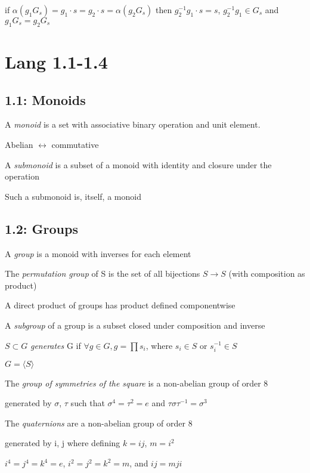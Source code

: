 \documentclass[12pt]{article}
\begin{document}
if $\alpha(g_1G_s) = g_1 \cdot s = g_2 \cdot s = \alpha(g_2G_s)$
then $g_2^{-1}g_1 \cdot s = s$, $g_2^{-1}g_1 \in G_s$ and $g_1G_s = g_2G_s$

\section{Lang 1.1-1.4}

\subsection{1.1: Monoids}

\noindent
A \textit{monoid} is a set with associative binary operation and unit element.

Abelian $\leftrightarrow$ commutative

\noindent
A \textit{submonoid} is a subset of a monoid with identity and closure under the operation

Such a submonoid is, itself, a monoid

\subsection{1.2: Groups}

\noindent
A \textit{group} is a monoid with inverses for each element

\noindent
The \textit{permutation group} of S is the set of all bijections $S \to S$ (with composition as product)

\noindent
A direct product of groups has product defined componentwise

\noindent
A \textit{subgroup} of a group is a subset closed under composition and inverse

\noindent
$S \subset G$ \textit{generates} G if $\forall g \in G, g = \prod s_i$, where $s_i \in S$ or $s_i^{-1} \in S$

$G = \langle S \rangle$

\noindent
The \textit{group of symmetries of the square} is a non-abelian group of order 8

generated by $\sigma$, $\tau$ such that $\sigma^4 = \tau^2 = e$ and $\tau \sigma \tau^{-1} = \sigma^3$

\noindent
The \textit{quaternions} are a non-abelian group of order 8

generated by i, j where defining $k = ij$, $m = i^2$

$i^4 = j^4 = k^4 = e$, $i^2 = j^2 = k^2 = m$, and $ij = mji$
\end{document}
